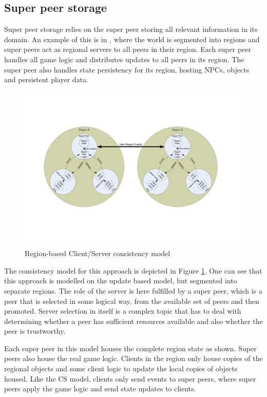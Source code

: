 \documentclass[journal,oneside,a4paper,onecolumn]{IEEEtran}
\begin{document}
\subsection{Super peer storage}

Super peer storage relies on the super peer storing all relevant information in its domain. An example of this is in \cite{knutsson_p2p_first}, where the world is segmented into regions and super peers act as regional servers to all peers in their region. Each super peer handles all game logic and distributes updates to all peers in its region. The super peer also handles state persistency for its region, hosting NPCs, objects and persistent player data.

\begin{figure}[htbp]
 \centering
 \includegraphics[clip=true, viewport=2cm 5cm 27cm 16.5cm, width=\columnwidth]{region_based_CS_CM}
 \caption{Region-based Client/Server consistency model}
 \label{fig_cs_region_cm}
\end{figure}
%
The consistency model for this approach is depicted in Figure \ref{fig_cs_region_cm}. One can see that this approach is modelled on the update based model, but segmented into separate regions. The role of the server is here fulfilled by a super peer, which is a peer that is selected in some logical way, from the available set of peers and then promoted. Server selection in itself is a complex topic that has to deal with determining whether a peer has sufficient resources available and also whether the peer is trustworthy.

Each super peer in this model houses the complete region state as shown. Super peers also house the real game logic. Clients in the region only house copies of the regional objects and some client logic to update the local copies of objects housed. Like the \ac{CS} model, clients only send events to super peers, where super peers apply the game logic and send state updates to clients.
\end{document}
